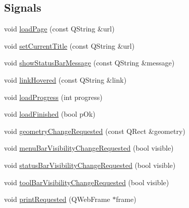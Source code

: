 \subsection*{Signals}
\begin{DoxyCompactItemize}
\item 
void \hyperlink{class_w_b_tab_widget_aa443c2f4e0768b3131abaa1a01636869}{load\-Page} (const Q\-String \&url)
\item 
void \hyperlink{class_w_b_tab_widget_a3b28b8cac1fdd541c43fea1443ec4a01}{set\-Current\-Title} (const Q\-String \&url)
\item 
void \hyperlink{class_w_b_tab_widget_a7d439a44e5e96bdeeb5e755e2c75dcc4}{show\-Status\-Bar\-Message} (const Q\-String \&message)
\item 
void \hyperlink{class_w_b_tab_widget_a4d2b74b5c1d2b7ca6536ba62c8ae3b9b}{link\-Hovered} (const Q\-String \&link)
\item 
void \hyperlink{class_w_b_tab_widget_a51756cd7c0eff3cc86aac5b0fe637414}{load\-Progress} (int progress)
\item 
void \hyperlink{class_w_b_tab_widget_a211c0d8c59d3eb984a4cff0bcd830e44}{load\-Finished} (bool p\-Ok)
\item 
void \hyperlink{class_w_b_tab_widget_aa1663510374670ae7518057c2140111e}{geometry\-Change\-Requested} (const Q\-Rect \&geometry)
\item 
void \hyperlink{class_w_b_tab_widget_a254aaa194ee6cbd89ab9a5f9e40aa37f}{menu\-Bar\-Visibility\-Change\-Requested} (bool visible)
\item 
void \hyperlink{class_w_b_tab_widget_aa8ce4fdde8b862f9b7ee079d3d275191}{status\-Bar\-Visibility\-Change\-Requested} (bool visible)
\item 
void \hyperlink{class_w_b_tab_widget_ab8f7f7cf156f48740af26f772d9463a4}{tool\-Bar\-Visibility\-Change\-Requested} (bool visible)
\item 
void \hyperlink{class_w_b_tab_widget_a600ee4e9ac46366bcb691b438d6ca8b0}{print\-Requested} (Q\-Web\-Frame $\ast$frame)
\end{DoxyCompactItemize}
